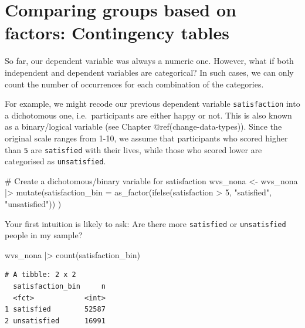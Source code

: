 \documentclass[
  letterpaper,
]{krantz}
\makeatletter
\newenvironment{Shaded}{\begin{snugshade}}{\end{snugshade}}
\newcommand{\AttributeTok}[1]{\textcolor[rgb]{0.40,0.45,0.13}{#1}}
\newcommand{\CommentTok}[1]{\textcolor[rgb]{0.37,0.37,0.37}{#1}}
\newcommand{\DecValTok}[1]{\textcolor[rgb]{0.68,0.00,0.00}{#1}}
\newcommand{\FunctionTok}[1]{\textcolor[rgb]{0.28,0.35,0.67}{#1}}
\newcommand{\NormalTok}[1]{\textcolor[rgb]{0.00,0.23,0.31}{#1}}
\newcommand{\OtherTok}[1]{\textcolor[rgb]{0.00,0.23,0.31}{#1}}
\newcommand{\SpecialCharTok}[1]{\textcolor[rgb]{0.37,0.37,0.37}{#1}}
\newcommand{\StringTok}[1]{\textcolor[rgb]{0.13,0.47,0.30}{#1}}
\newenvironment{kframe}{%
\medskip{}
\setlength{\fboxsep}{.8em}
 \def\at@end@of@kframe{}%
 \ifinner\ifhmode%
  \def\at@end@of@kframe{\end{minipage}}%
  \begin{minipage}{\columnwidth}%
 \fi\fi%
 \def\FrameCommand##1{\hskip\@totalleftmargin \hskip-\fboxsep
 \colorbox{shadecolor}{##1}\hskip-\fboxsep
     \hskip-\linewidth \hskip-\@totalleftmargin \hskip\columnwidth}%
 \MakeFramed {\advance\hsize-\width
   \@totalleftmargin\z@ \linewidth\hsize
   \@setminipage}}%
 {\par\unskip\endMakeFramed%
 \at@end@of@kframe}
\renewenvironment{Shaded}{\begin{kframe}}{\end{kframe}}
\makeatother
\begin{document}
\section{Comparing groups based on factors: Contingency
tables}\label{sec-chi-squared-test}

So far, our dependent variable was always a numeric one. However, what
if both independent and dependent variables are categorical? In such
cases, we can only count the number of occurrences for each combination
of the categories.

For example, we might recode our previous dependent variable
\texttt{satisfaction} into a dichotomous one, i.e.~participants are
either happy or not. This is also known as a binary/logical variable
(see Chapter @ref(change-data-types)). Since the original scale ranges
from 1-10, we assume that participants who scored higher than \texttt{5}
are \texttt{satisfied} with their lives, while those who scored lower
are categorised as \texttt{unsatisfied}.

\begin{Shaded}
\begin{Highlighting}[]
\CommentTok{\# Create a dichotomous/binary variable for satisfaction}
\NormalTok{wvs\_nona }\OtherTok{\textless{}{-}}
\NormalTok{  wvs\_nona }\SpecialCharTok{|\textgreater{}}
  \FunctionTok{mutate}\NormalTok{(}\AttributeTok{satisfaction\_bin =} \FunctionTok{as\_factor}\NormalTok{(}\FunctionTok{ifelse}\NormalTok{(satisfaction }\SpecialCharTok{\textgreater{}} \DecValTok{5}\NormalTok{,}
                                             \StringTok{"satisfied"}\NormalTok{,}
                                             \StringTok{"unsatisfied"}\NormalTok{))}
\NormalTok{         )}
\end{Highlighting}
\end{Shaded}

Your first intuition is likely to ask: Are there more \texttt{satisfied}
or \texttt{unsatisfied} people in my sample?

\begin{Shaded}
\begin{Highlighting}[]
\NormalTok{wvs\_nona }\SpecialCharTok{|\textgreater{}} \FunctionTok{count}\NormalTok{(satisfaction\_bin)}
\end{Highlighting}
\end{Shaded}

\begin{verbatim}
# A tibble: 2 x 2
  satisfaction_bin     n
  <fct>            <int>
1 satisfied        52587
2 unsatisfied      16991
\end{verbatim}
\end{document}
